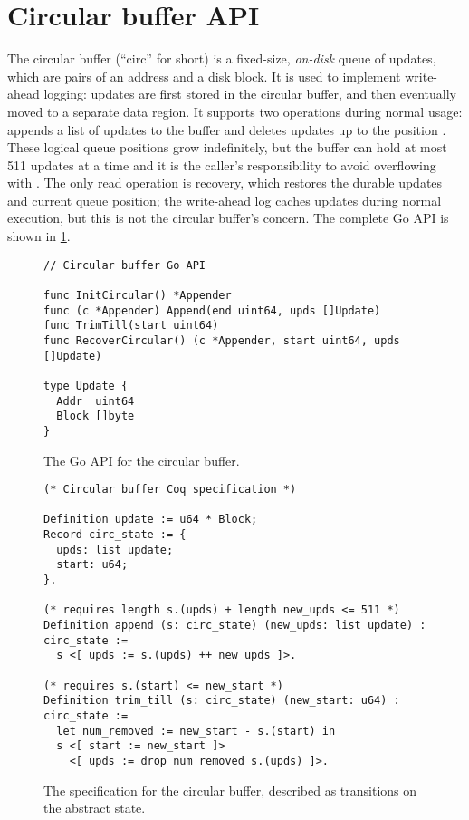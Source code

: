 \section{Circular buffer API}


The circular buffer (``circ'' for short) is a fixed-size, \emph{on-disk} queue of
updates, which are pairs of an address and a disk block. It is used to implement
write-ahead logging: updates are first stored in the circular buffer, and
then eventually moved to a separate data region. It supports two operations
during normal usage:  appends a list of updates to the buffer
and  deletes updates up to the position . These logical queue positions grow
indefinitely, but the buffer can hold at most 511 updates at a time and it
is the caller's responsibility to avoid overflowing with . The only
read operation is recovery, which restores the durable updates and current queue
position; the write-ahead log caches updates during normal execution, but this
is not the circular buffer's concern. The complete Go API is shown in
\cref{fig:circ:api}.

\begin{figure}[ht]
\begin{verbatim}
// Circular buffer Go API

func InitCircular() *Appender
func (c *Appender) Append(end uint64, upds []Update)
func TrimTill(start uint64)
func RecoverCircular() (c *Appender, start uint64, upds []Update)

type Update {
  Addr  uint64
  Block []byte
}
\end{verbatim}
  \caption{The Go API for the circular buffer.}%
  \label{fig:circ:api}
\end{figure}

\begin{figure}[ht]
\begin{verbatim}
(* Circular buffer Coq specification *)

Definition update := u64 * Block;
Record circ_state := {
  upds: list update;
  start: u64;
}.

(* requires length s.(upds) + length new_upds <= 511 *)
Definition append (s: circ_state) (new_upds: list update) : circ_state :=
  s <[ upds := s.(upds) ++ new_upds ]>.

(* requires s.(start) <= new_start *)
Definition trim_till (s: circ_state) (new_start: u64) : circ_state :=
  let num_removed := new_start - s.(start) in
  s <[ start := new_start ]>
    <[ upds := drop num_removed s.(upds) ]>.
\end{verbatim}
  \caption{The specification for the circular buffer, described as transitions
    on the abstract state.}
  \label{fig:circ:spec}
\end{figure}

